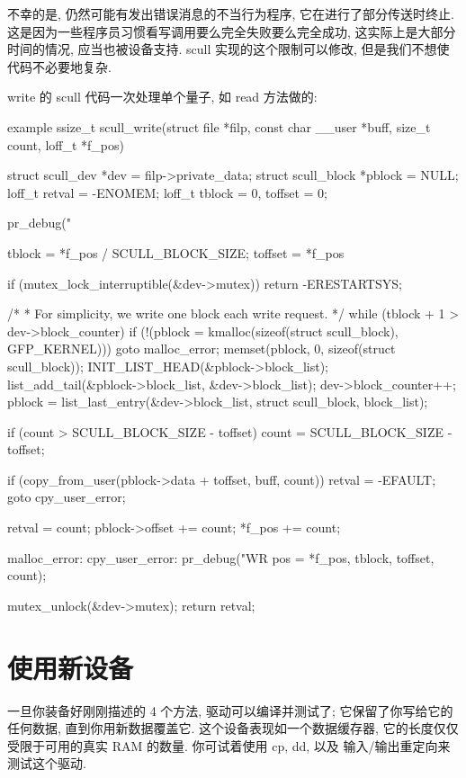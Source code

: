 \documentclass[lang=cn,newtx,10pt,scheme=chinese]{elegantbook}
\begin{document}
不幸的是, 仍然可能有发出错误消息的不当行为程序, 它在进行了部分传送时终止. 这是因为一些程序员习惯看写调用要么完全失败要么完全成功, 这实际上是大部分时间的情况, 应当也被设备支持. scull 实现的这个限制可以修改, 但是我们不想使代码不必要地复杂.

write 的 scull 代码一次处理单个量子, 如 read 方法做的:

\begin{mycode}{example}
ssize_t scull_write(struct file *filp, const char __user *buff, size_t count,
                    loff_t *f_pos)
{
    struct scull_dev *dev = filp->private_data;
    struct scull_block *pblock = NULL;
    loff_t retval = -ENOMEM;
    loff_t tblock = 0, toffset = 0;

    pr_debug("%

    tblock = *f_pos / SCULL_BLOCK_SIZE;
    toffset = *f_pos %

    if (mutex_lock_interruptible(&dev->mutex))
        return -ERESTARTSYS;

    /*
     * For simplicity, we write one block each write request.
     */
    while (tblock + 1 > dev->block_counter)
    {
        if (!(pblock = kmalloc(sizeof(struct scull_block), GFP_KERNEL)))
            goto malloc_error;
        memset(pblock, 0, sizeof(struct scull_block));
        INIT_LIST_HEAD(&pblock->block_list);
        list_add_tail(&pblock->block_list, &dev->block_list);
        dev->block_counter++;
    }
    pblock = list_last_entry(&dev->block_list, struct scull_block, block_list);

    if (count > SCULL_BLOCK_SIZE - toffset)
        count = SCULL_BLOCK_SIZE - toffset;

    if (copy_from_user(pblock->data + toffset, buff, count))
    {
        retval = -EFAULT;
        goto cpy_user_error;
    }

    retval = count;
    pblock->offset += count;
    *f_pos += count;

malloc_error:
cpy_user_error:
    pr_debug("WR pos = %
             *f_pos, tblock, toffset, count);

    mutex_unlock(&dev->mutex);
    return retval;
}
\end{mycode}

\section{使用新设备}

一旦你装备好刚刚描述的 4 个方法, 驱动可以编译并测试了; 它保留了你写给它的任何数据, 直到你用新数据覆盖它. 这个设备表现如一个数据缓存器, 它的长度仅仅受限于可用的真实 RAM 的数量. 你可试着使用 cp, dd, 以及 输入/输出重定向来测试这个驱动.
\end{document}
